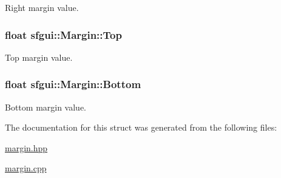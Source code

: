 Right margin value. 

\hypertarget{structsfgui_1_1Margin_1ab360b58e3be2e8385f8e4225508ea4}{
\subsubsection[Top]{\setlength{\rightskip}{0pt plus 5cm}float {\bf sfgui::Margin::Top}}}
\label{structsfgui_1_1Margin_1ab360b58e3be2e8385f8e4225508ea4}


Top margin value. 

\hypertarget{structsfgui_1_1Margin_f9b744e36bb7d913b20959f7c9516fa6}{
\subsubsection[Bottom]{\setlength{\rightskip}{0pt plus 5cm}float {\bf sfgui::Margin::Bottom}}}
\label{structsfgui_1_1Margin_f9b744e36bb7d913b20959f7c9516fa6}


Bottom margin value. 



The documentation for this struct was generated from the following files:\begin{CompactItemize}
\item 
\hyperlink{margin_8hpp}{margin.hpp}\item 
\hyperlink{margin_8cpp}{margin.cpp}\end{CompactItemize}

